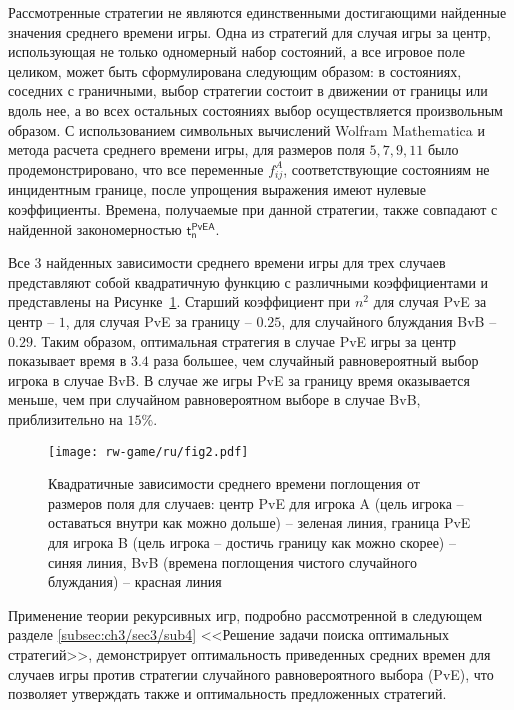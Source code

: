 Рассмотренные стратегии не являются единственными достигающими найденные значения среднего времени игры. Одна из стратегий для случая игры за центр, использующая не только одномерный набор состояний, а все игровое поле целиком, может быть сформулирована следующим образом: в состояниях, соседних с граничными, выбор стратегии состоит в движении от границы или вдоль нее, а во всех остальных состояниях выбор осуществляется произвольным образом. С использованием символьных вычислений Wolfram Mathematica и метода расчета среднего времени игры, для размеров поля $5, 7, 9, 11$ было продемонстрировано, что все переменные $f_{ij}^A$, соответствующие состояниям не инцидентным границе, после упрощения выражения имеют нулевые коэффициенты. Времена, получаемые при данной стратегии, также совпадают с найденной закономерностью $\boldsymbol{\mathsf{t_n^{PvE A}}}$.

Все 3 найденных зависимости среднего времени игры для трех случаев представляют собой квадратичную функцию с различными коэффициентами и представлены на Рисунке~\cref{fig:quadratic:time}. Старший коэффициент при $n^2$ для случая PvE за центр -- $1$, для случая PvE за границу -- $0.25$, для случайного блуждания BvB -- $0.29$. Таким образом, оптимальная стратегия в случае PvE игры за центр показывает время в $3.4$ раза большее, чем случайный равновероятный выбор игрока в случае BvB. В случае же игры PvE за границу время оказывается меньше, чем при случайном равновероятном выборе в случае BvB, приблизительно на $15\%$.

\begin{figure}[t]
    \centering
    \texttt{[image: rw-game/ru/fig2.pdf]}
    \caption{
        Квадратичные зависимости среднего времени поглощения от размеров поля для случаев: центр PvE для игрока A (цель игрока -- оставаться внутри как можно дольше) -- зеленая линия, граница PvE для игрока B (цель игрока -- достичь границу как можно скорее) -- синяя линия, BvB (времена поглощения чистого случайного блуждания) -- красная линия
    }  
    \label{fig:quadratic:time}
\end{figure}

Применение теории рекурсивных игр, подробно рассмотренной в следующем разделе \cref{subsec:ch3/sec3/sub4} <<Решение задачи поиска оптимальных стратегий>>, демонстрирует оптимальность приведенных средних времен для случаев игры против стратегии случайного равновероятного выбора (PvE), что позволяет утверждать также и оптимальность предложенных стратегий.

